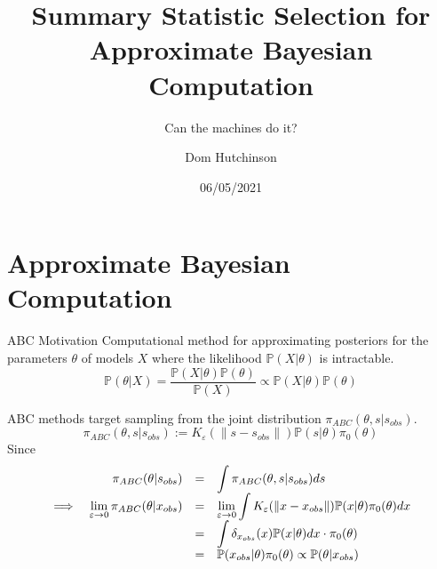 \documentclass[aspectratio=169]{beamer}
\title[Short Title]{Summary Statistic Selection for Approximate Bayesian Computation}
\subtitle{Can the machines do it?}
\author{Dom Hutchinson}
\date{06/05/2021}
\begin{document}



\begin{frame}[leftcolor=CoolGrey,rightcolor=UniversityRed,div=0.85\paperwidth]
  \titlepage
\end{frame}

\section{Approximate Bayesian Computation}

\begin{frame}{ABC Motivation}\small
  Computational method for approximating posteriors for the parameters $\theta$ of models $X$ where the likelihood $\mathbb{P}(X|\theta)$ is intractable.
  \[ \mathbb{P}(\theta|X)=\frac{\mathbb{P}(X|\theta)\mathbb{P}(\theta)}{\mathbb{P}(X)}\propto\mathbb{P}(X|\theta)\mathbb{P}(\theta) \]

  ABC methods target sampling from the joint distribution $\pi_{ABC}(\theta,s|s_{obs})$.
  \[ \pi_{ABC}(\theta,s|s_{obs}):=K_\varepsilon(\|s-s_{obs}\|)\mathbb{P}(s|\theta)\pi_0(\theta) \]
  Since
  \[\everymath={\displaystyle}\begin{array}{rrrl}
    &\pi_{ABC}(\theta|s_{obs})&=&\int \pi_{ABC}(\theta,s|s_{obs})ds\\
    \implies&\lim_{\varepsilon\to0}\pi_{ABC}(\theta|x_{obs})&=&\lim_{\varepsilon\to0}\int K_\varepsilon(\|x-x_{obs}\|)\mathbb{P}(x|\theta)\pi_0(\theta)dx\\
    &&=&\int \delta_{x_{obs}}(x)\mathbb{P}(x|\theta)dx\cdot \pi_0(\theta)\\
    &&=&\mathbb{P}(x_{obs}|\theta)\pi_0(\theta)\propto\mathbb{P}(\theta|x_{obs})
  \end{array}\]
\end{frame}
\end{document}
